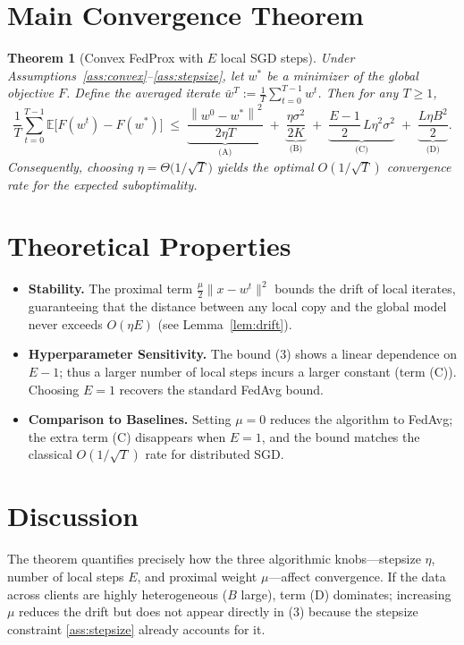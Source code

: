 \documentclass{article}
\newtheorem{theorem}{Theorem}
\newcommand{\E}{\mathbb{E}}
\newcommand{\norm}[1]{\left\lVert#1\right\rVert}
\begin{document}
\section*{Main Convergence Theorem}
\begin{theorem}[Convex FedProx with $E$ local SGD steps]\label{thm:main}
Under Assumptions~\ref{ass:convex}–\ref{ass:stepsize}, let $w^{*}$ be a minimizer of the global objective $F$.  
Define the averaged iterate $\bar w^{T}:=\frac{1}{T}\sum_{t=0}^{T-1} w^{t}$.  
Then for any $T\ge1$,
\[
\frac{1}{T}\sum_{t=0}^{T-1}\E\!\bigl[F(w^{t})-F(w^{*})\bigr]
\;\le\;
\underbrace{\frac{\norm{w^{0}-w^{*}}^{2}}{2\eta T}}_{\text{(A)}}
\;+\;
\underbrace{\frac{\eta\sigma^{2}}{2K}}_{\text{(B)}}
\;+\;
\underbrace{\frac{E-1}{2}\,L\eta^{2}\sigma^{2}}_{\text{(C)}}
\;+\;
\underbrace{\frac{L\eta B^{2}}{2}}_{\text{(D)}}.
\tag{3}
\]
Consequently, choosing $\eta = \Theta\!\bigl(1/\sqrt{T}\bigr)$ yields the optimal $O(1/\sqrt{T})$ convergence rate for the expected suboptimality.
\end{theorem}

\section*{Theoretical Properties}
\begin{itemize}
    \item \textbf{Stability.} The proximal term $\frac{\mu}{2}\|x-w^{t}\|^{2}$ bounds the drift of local iterates, guaranteeing that the distance between any local copy and the global model never exceeds $O(\eta E)$ (see Lemma~\ref{lem:drift}).
    \item \textbf{Hyperparameter Sensitivity.} The bound (3) shows a linear dependence on $E-1$; thus a larger number of local steps incurs a larger constant (term (C)). Choosing $E=1$ recovers the standard FedAvg bound.
    \item \textbf{Comparison to Baselines.} Setting $\mu=0$ reduces the algorithm to FedAvg; the extra term (C) disappears when $E=1$, and the bound matches the classical $O(1/\sqrt{T})$ rate for distributed SGD.
\end{itemize}

\section*{Discussion}
The theorem quantifies precisely how the three algorithmic knobs—stepsize $\eta$, number of local steps $E$, and proximal weight $\mu$—affect convergence.  
If the data across clients are highly heterogeneous ($B$ large), term (D) dominates; increasing $\mu$ reduces the drift but does not appear directly in (3) because the stepsize constraint \eqref{ass:stepsize} already accounts for it.  
\end{document}
